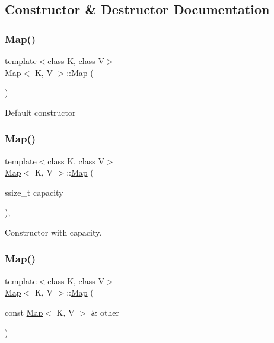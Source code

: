 \subsection{Constructor \& Destructor Documentation}
\mbox{\label{classMap_a06f9fc5d4c9a639994f8d8eb280ae7ed}} 
\subsubsection{\texorpdfstring{Map()}{Map()}\hspace{0.1cm}{\footnotesize\ttfamily [1/8]}}
{\footnotesize\ttfamily template$<$class K, class V$>$ \\
\hyperlink{classMap}{Map}$<$ K, V $>$\+::\hyperlink{classMap}{Map} (\begin{DoxyParamCaption}{ }\end{DoxyParamCaption})\hspace{0.3cm}{\ttfamily [inline]}}

Default constructor \mbox{\label{classMap_a6a09ecf2e2b5a016be8f3034ef67c051}} 
\subsubsection{\texorpdfstring{Map()}{Map()}\hspace{0.1cm}{\footnotesize\ttfamily [2/8]}}
{\footnotesize\ttfamily template$<$class K, class V$>$ \\
\hyperlink{classMap}{Map}$<$ K, V $>$\+::\hyperlink{classMap}{Map} (\begin{DoxyParamCaption}\item[{ssize\+\_\+t}]{capacity }\end{DoxyParamCaption})\hspace{0.3cm}{\ttfamily [inline]}, {\ttfamily [explicit]}}

Constructor with capacity. \mbox{\label{classMap_afd84c24b9220a40dda8ef82aaf533710}} 
\subsubsection{\texorpdfstring{Map()}{Map()}\hspace{0.1cm}{\footnotesize\ttfamily [3/8]}}
{\footnotesize\ttfamily template$<$class K, class V$>$ \\
\hyperlink{classMap}{Map}$<$ K, V $>$\+::\hyperlink{classMap}{Map} (\begin{DoxyParamCaption}\item[{const \hyperlink{classMap}{Map}$<$ K, V $>$ \&}]{other }\end{DoxyParamCaption})\hspace{0.3cm}{\ttfamily [inline]}}

